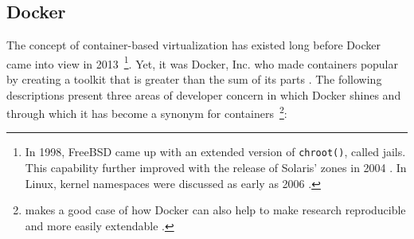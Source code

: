 \subsection{Docker}
\label{sec:docker}

The concept of container-based virtualization has existed long before Docker came into view in 2013~\footnote{In 1998, FreeBSD came up with an extended version of \texttt{chroot()}, called jails. This capability further improved with the release of Solaris' zones in 2004 \cite[p.~82]{bernstein2014containers}. In Linux, kernel namespaces were discussed as early as 2006 \cite[p.~1]{celesti2016exploring}.}. Yet, it was Docker, Inc. who made containers popular by creating a toolkit that is greater than the sum of its parts \cite[p.~1]{merkel2014docker}. The following descriptions present three areas of developer concern in which Docker shines and through which it has become a synonym for containers~\footnote{\citeauthor{boettiger2015introduction} makes a good case of how Docker can also help to make research reproducible and more easily extendable \cite[p.~71]{boettiger2015introduction}.}:

